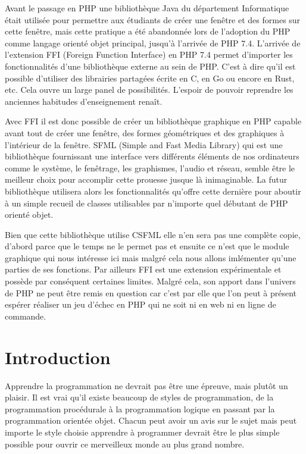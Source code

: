 \documentclass[11pt,a4paper,krantz2,11pt,oneside]{krantz}
\begin{document}
Avant le passage en PHP une bibliothèque Java du département Informatique était utilisée pour permettre aux étudiants de créer une fenêtre et des formes sur cette fenêtre, mais cette pratique a été abandonnée lors de l'adoption du PHP comme langage orienté objet principal, jusqu'à l'arrivée de PHP 7.4. L'arrivée de l'extension FFI (Foreign Function Interface) en PHP 7.4 permet d'importer les fonctionnalités d'une bibliothèque externe au sein de PHP. C'est à dire qu'il est possible d'utiliser des librairies partagées écrite en C, en Go ou encore en Rust, etc. Cela ouvre un large panel de possibilités. L'espoir de pouvoir reprendre les anciennes habitudes d'enseignement renaît.

Avec FFI il est donc possible de créer un bibliothèque graphique en PHP capable avant tout de créer une fenêtre, des formes géométriques et des graphiques à l'intérieur de la fenêtre. SFML (Simple and Fast Media Library) qui est une bibliothèque fournissant une interface vers différents éléments de nos ordinateurs comme le système, le fenêtrage, les graphismes, l'audio et réseau, semble être le meilleur choix pour accomplir cette prouesse jusque là inimaginable. La futur bibliothèque utilisera alors les fonctionnalités qu'offre cette dernière pour aboutir à un simple recueil de classes utilisables par n'importe quel débutant de PHP orienté objet.

Bien que cette bibliothèque utilise CSFML elle n'en sera pas une complète copie, d'abord parce que le temps ne le permet pas et ensuite ce n'est que le module graphique qui nous intéresse ici mais malgré cela nous allons imlémenter qu'une parties de ses fonctions. Par ailleurs FFI est une extension expérimentale et possède par conséquent certaines limites. Malgré cela, son apport dans l'univers de PHP ne peut être remis en question car c'est par elle que l'on peut à présent espérer réaliser un jeu d'échec en PHP qui ne soit ni en web ni en ligne de commande.

\hypertarget{intro}{%
\chapter*{Introduction}\label{intro}}


Apprendre la programmation ne devrait pas être une épreuve, mais plutôt un plaisir. Il est vrai qu'il existe beaucoup de styles de programmation, de la programmation procédurale à la programmation logique en passant par la programmation orientée objet. Chacun peut avoir un avis sur le sujet mais peut importe le style choisie apprendre à programmer devrait être le plus simple possible pour ouvrir ce merveilleux monde au plus grand nombre.
\end{document}

